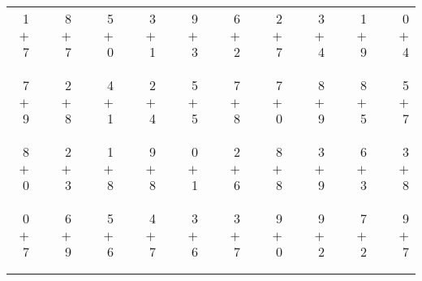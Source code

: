 \documentclass[12pt, letterpaper]{article}
\begin{document}
\begin{tabular}{rrrrrrrrrrrrrrrrrrr}
1 & & 8 & & 5 & & 3 & & 9 & & 6 & & 2 & & 3 & & 1 & & 0\\
$+$ 7 & & $+$ 7 & & $+$ 0 & & $+$ 1 & & $+$ 3 & & $+$ 2 & & $+$ 7 & & $+$ 4 & & $+$ 9 & & $+$ 4\\
\cline{1-1} \cline{3-3} \cline{5-5} \cline{7-7} \cline{9-9} \cline{11-11} \cline{13-13} \cline{15-15} \cline{17-17} \cline{19-19} \\ \\
7 & & 2 & & 4 & & 2 & & 5 & & 7 & & 7 & & 8 & & 8 & & 5\\
$+$ 9 & & $+$ 8 & & $+$ 1 & & $+$ 4 & & $+$ 5 & & $+$ 8 & & $+$ 0 & & $+$ 9 & & $+$ 5 & & $+$ 7\\
\cline{1-1} \cline{3-3} \cline{5-5} \cline{7-7} \cline{9-9} \cline{11-11} \cline{13-13} \cline{15-15} \cline{17-17} \cline{19-19} \\ \\
8 & & 2 & & 1 & & 9 & & 0 & & 2 & & 8 & & 3 & & 6 & & 3\\
$+$ 0 & & $+$ 3 & & $+$ 8 & & $+$ 8 & & $+$ 1 & & $+$ 6 & & $+$ 8 & & $+$ 9 & & $+$ 3 & & $+$ 8\\
\cline{1-1} \cline{3-3} \cline{5-5} \cline{7-7} \cline{9-9} \cline{11-11} \cline{13-13} \cline{15-15} \cline{17-17} \cline{19-19} \\ \\
0 & & 6 & & 5 & & 4 & & 3 & & 3 & & 9 & & 9 & & 7 & & 9\\
$+$ 7 & & $+$ 9 & & $+$ 6 & & $+$ 7 & & $+$ 6 & & $+$ 7 & & $+$ 0 & & $+$ 2 & & $+$ 2 & & $+$ 7\\
\cline{1-1} \cline{3-3} \cline{5-5} \cline{7-7} \cline{9-9} \cline{11-11} \cline{13-13} \cline{15-15} \cline{17-17} \cline{19-19} \\ \\
\end{tabular}
\newpage
\end{document}
